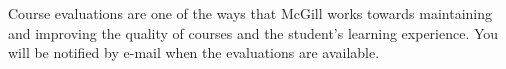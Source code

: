 Course evaluations are one of the ways that McGill works towards
maintaining and improving the quality of courses and the student’s
learning experience. You will be notified by e-mail when the
evaluations are available.
